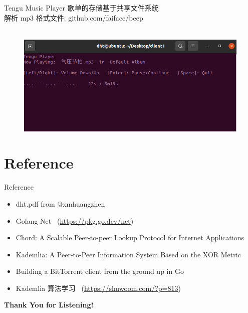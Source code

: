 \documentclass[10pt]{beamer}
\begin{document}
\begin{frame}{Tengu Music Player}
歌单的存储基于共享文件系统 \\

解析 mp3 格式文件: github.com/faiface/beep \\
\\[20pt]
\begin{figure}
\centering
\includegraphics[scale=0.4]{figure/music.png}
\end{figure}

\end{frame}

\section{Reference}

\begin{frame}{Reference}

\begin{itemize}
\item
\alert{dht.pdf} from @xmhuangzhen

\item
\alert{Golang Net} \ (\url{https://pkg.go.dev/net})

\item
\alert{Chord: A Scalable Peer-to-peer Lookup Protocol for Internet Applications}

\item
\alert{Kademlia: A Peer-to-Peer Information System Based on the XOR Metric}

\item
\alert{Building a BitTorrent client from the ground up in Go}

\item
\alert{Kademlia 算法学习} \ (\url{https://shuwoom.com/?p=813})

\end{itemize}

\end{frame}

\begin{frame}[standout]
  \centering
  \textbf{Thank You for Listening!}
\end{frame}
\end{document}
